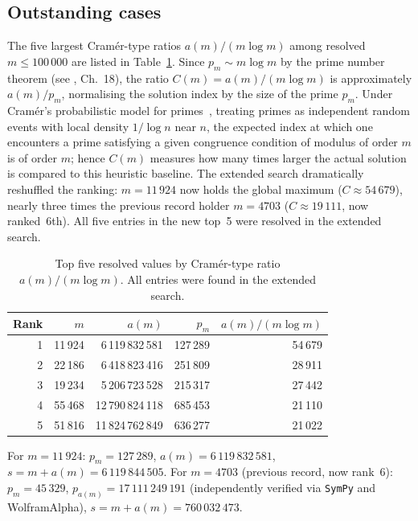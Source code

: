 \documentclass[12pt]{article}
\begin{document}
	\subsection{Outstanding cases}
	
	The five largest Cram\'er-type ratios $a(m)/(m\log m)$ among resolved
	$m \leq 100\,000$ are listed in Table~\ref{tab:ratio}.
	Since $p_m \sim m\log m$ by the prime number theorem
	(see \cite{Davenport}, Ch.~18), the ratio
	$C(m) = a(m)/(m\log m)$ is approximately $a(m)/p_m$, normalising the
	solution index by the size of the prime $p_m$.
	Under Cram\'er's probabilistic model for primes~\cite{Cramer1936},
	treating primes as independent random events with local density
	$1/\log n$ near $n$, the expected index at which one encounters a prime
	satisfying a given congruence condition of modulus of order $m$ is of
	order $m$; hence $C(m)$ measures how many times larger the actual
	solution is compared to this heuristic baseline.
	The extended search dramatically reshuffled the ranking:
	$m = 11\,924$ now holds the global maximum
	($C \approx 54\,679$), nearly three times the previous record holder
	$m = 4703$ ($C \approx 19\,111$, now ranked~6th).
	All five entries in the new top~5 were resolved in the extended search.
	
	\begin{table}[ht]
		\centering
		\caption{Top five resolved values by Cram\'er-type ratio
			$a(m)/(m\log m)$.  All entries were found in the extended search.}
		\label{tab:ratio}
		\begin{tabular}{rrrrr}
			\toprule
			Rank & $m$ & $a(m)$ & $p_m$ & $a(m)/(m\log m)$ \\
			\midrule
			1 & 11\,924 & 6\,119\,832\,581 & 127\,289 & 54\,679 \\
			2 & 22\,186 & 6\,418\,823\,416 & 251\,809 & 28\,911 \\
			3 & 19\,234 & 5\,206\,723\,528 & 215\,317 & 27\,442 \\
			4 & 55\,468 & 12\,790\,824\,118 & 685\,453 & 21\,110 \\
			5 & 51\,816 & 11\,824\,762\,849 & 636\,277 & 21\,022 \\
			\bottomrule
		\end{tabular}
	\end{table}
	
	For $m = 11\,924$: $p_m = 127\,289$,
	$a(m) = 6\,119\,832\,581$,
	$s = m + a(m) = 6\,119\,844\,505$.
	For $m = 4703$ (previous record, now rank~6): $p_m = 45\,329$,
	$p_{a(m)} = 17\,111\,249\,191$ (independently verified via \texttt{SymPy}
	and WolframAlpha),
	$s = m + a(m) = 760\,032\,473$.
	
\end{document}
